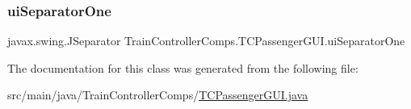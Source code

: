 \subsubsection{\texorpdfstring{ui\+Separator\+One}{uiSeparatorOne}}
{\footnotesize\ttfamily javax.\+swing.\+J\+Separator Train\+Controller\+Comps.\+T\+C\+Passenger\+G\+U\+I.\+ui\+Separator\+One\hspace{0.3cm}{\ttfamily [private]}}



The documentation for this class was generated from the following file\+:\begin{DoxyCompactItemize}
\item 
src/main/java/\+Train\+Controller\+Comps/\hyperlink{TCPassengerGUI_8java}{T\+C\+Passenger\+G\+U\+I.\+java}\end{DoxyCompactItemize}
